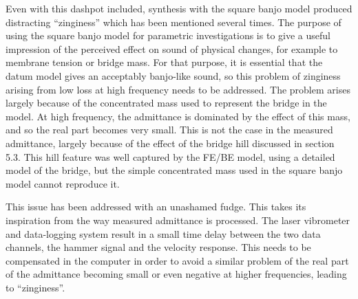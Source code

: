 



  Even with this dashpot included, synthesis with the square banjo model 
  produced distracting ``zinginess'' which has been mentioned several times. 
  The purpose of using the square banjo model for parametric investigations is 
  to give a useful impression of the perceived effect on sound of physical 
  changes, for example to membrane tension or bridge mass. For that purpose, it 
  is essential that the datum model gives an acceptably banjo-like sound, so 
  this problem of zinginess arising from low loss at high frequency needs to be 
  addressed. The problem arises largely because of the concentrated mass used 
  to represent the bridge in the model. At high frequency, the admittance is 
  dominated by the effect of this mass, and so the real part becomes very 
  small. This is not the case in the measured admittance, largely because of 
  the effect of the bridge hill discussed in section 5.3. This hill feature was 
  well captured by the FE/BE model, using a detailed model of the bridge, but 
  the simple concentrated mass used in the square banjo model cannot reproduce 
  it. 

  This issue has been addressed with an unashamed fudge. This takes its 
  inspiration from the way measured admittance is processed. The laser 
  vibrometer and data-logging system result in a small time delay between the 
  two data channels, the hammer signal and the velocity response. This needs to 
  be compensated in the computer in order to avoid a similar problem of the 
  real part of the admittance becoming small or even negative at higher 
  frequencies, leading to ``zinginess''. 

